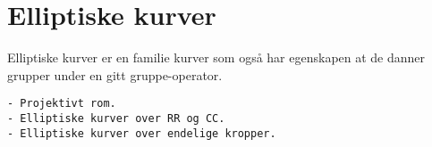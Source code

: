 \section{Elliptiske kurver}

Elliptiske kurver er en familie kurver som også har egenskapen at de danner grupper
under en gitt gruppe-operator.
\cite{silverman_arithmetic_2009}

\begin{verbatim}
- Projektivt rom.
- Elliptiske kurver over RR og CC.
- Elliptiske kurver over endelige kropper.
\end{verbatim}

